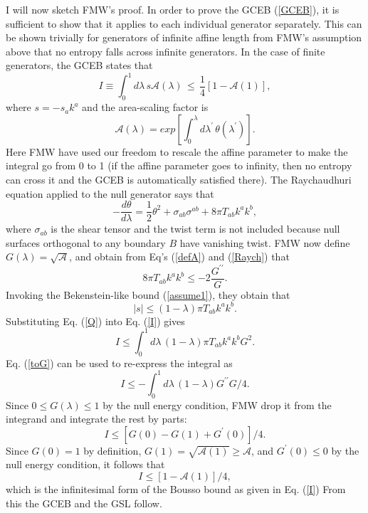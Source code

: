\documentclass[12pt]{article}
\begin{document}
I will now sketch FMW's proof.  In order to prove the GCEB (\ref{GCEB}), it is sufficient to show that it applies to each individual generator separately.  This can be shown trivially for generators of infinite affine length from FMW's assumption above that no entropy falls across infinite generators.  In the case of finite generators, the GCEB states that
\begin{equation}\label{I}
I \equiv \int_0^1 d\lambda\,s\mathcal{A}(\lambda)\,\le\,\frac{1}{4}[1 - \mathcal{A}(1)],
\end{equation}
where $s = -s_a k^a$ and the area-scaling factor is
\begin{equation}\label{defA}
\mathcal{A}(\lambda) = exp
\left[\int^{\lambda}_0 d\lambda^{\prime}\,\theta(\lambda^{\prime}) \right].
\end{equation}
Here FMW have used our freedom to rescale the affine parameter to make the integral go from 0 to 1 (if the affine parameter goes to infinity, then no entropy can cross it and the GCEB is automatically satisfied there).  The Raychaudhuri equation applied to the null generator says that
\begin{equation}\label{Raych}
-\frac{d\theta}{d\lambda} = \frac{1}{2}\theta^2 
+ \sigma_{ab}\sigma^{ab}
+ 8\pi T_{ab}k^ak^b,
\end{equation}
where $\sigma_{ab}$ is the shear tensor and the twist term is not included because null surfaces orthogonal to any boundary $B$ have vanishing twist.  FMW now define
$G(\lambda) = \sqrt{\mathcal{A}}$, and obtain from Eq's (\ref{defA}) and (\ref{Raych}) that
\begin{equation}\label{toG}
8\pi T_{ab}k^ak^b \le -2\frac{G^{\prime\prime}}{G}.
\end{equation}
Invoking the Bekenstein-like bound (\ref{assume1}), they obtain that
\begin{equation}\label{Q}
|s| \le (1 - \lambda)\pi T_{ab}k^a k^b.
\end{equation}
Substituting Eq. (\ref{Q}) into Eq. (\ref{I}) gives
\begin{equation}
I \le \int_0^1 d\lambda\,(1 - \lambda)\pi T_{ab}k^a k^b G^2.
\end{equation}
Eq. (\ref{toG}) can be used to re-express the integral as
\begin{equation}
I \le - \int_0^1 d\lambda\,(1 -\lambda)G^{\prime\prime}G/4.
\end{equation}
Since $0 \le G(\lambda) \le 1$ by the null energy condition, FMW drop it from the integrand and integrate the rest by parts:
\begin{equation}
I \le [G(0) - G(1) + G^{\prime}(0)]/4.
\end{equation}
Since $G(0) = 1$ by definition, $G(1) = \sqrt{\mathcal{A}(1)} \ge \mathcal{A}$, and $G^{\prime}(0) \le 0$ by the null energy condition, it follows that
\begin{equation}
I \le [1 - \mathcal{A}(1)]/4,
\end{equation}
which is the infinitesimal form of the Bousso bound as given in Eq. (\ref{I})  From this the GCEB and the GSL follow.
\end{document}
